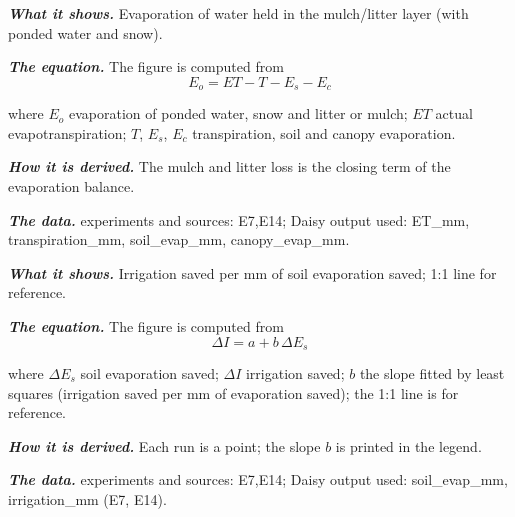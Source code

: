 \label{fig:a20_16}
\par\noindent\textbf{\color{khmag}\emph{What it shows.}} Evaporation of water held in the mulch/litter layer (with ponded water and snow).
\par\noindent\textbf{\color{khmag}\emph{The equation.}} The figure is computed from
\begin{equation}\boxed{E_o=ET-T-E_s-E_c}\end{equation}
\par\noindent where $E_o$ evaporation of ponded water, snow and litter or mulch; $ET$ actual evapotranspiration; $T$, $E_s$, $E_c$ transpiration, soil and canopy evaporation.
\par\noindent\textbf{\color{khmag}\emph{How it is derived.}} The mulch and litter loss is the closing term of the evaporation balance.
\par\noindent\textbf{\color{khmag}\emph{The data.}} experiments and sources: E7,E14; Daisy output used: ET\_mm, transpiration\_mm, soil\_evap\_mm, canopy\_evap\_mm.
\par\vspace{6pt}\noindent{}\par\nobreak
{}\label{fig:a20_17}
\par\noindent\textbf{\color{khmag}\emph{What it shows.}} Irrigation saved per mm of soil evaporation saved; 1:1 line for reference.
\par\noindent\textbf{\color{khmag}\emph{The equation.}} The figure is computed from
\begin{equation}\boxed{\Delta I=a+b\,\Delta E_s}\end{equation}
\par\noindent where $\Delta E_s$ soil evaporation saved; $\Delta I$ irrigation saved; $b$ the slope fitted by least squares (irrigation saved per mm of evaporation saved); the 1:1 line is for reference.
\par\noindent\textbf{\color{khmag}\emph{How it is derived.}} Each run is a point; the slope $b$ is printed in the legend.
\par\noindent\textbf{\color{khmag}\emph{The data.}} experiments and sources: E7,E14; Daisy output used: soil\_evap\_mm, irrigation\_mm (E7, E14).
\par\vspace{6pt}\noindent{}\par\nobreak

